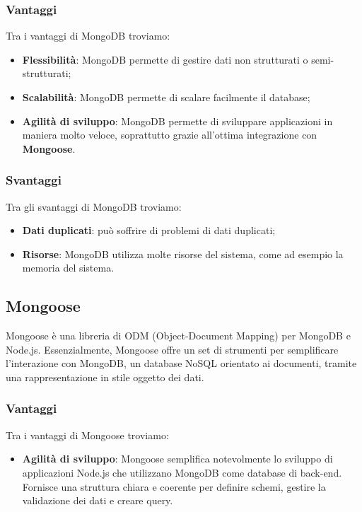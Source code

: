 \subsubsection*{Vantaggi}
Tra i vantaggi di MongoDB troviamo:
\begin{itemize}
    \item \textbf{Flessibilità}: MongoDB permette di gestire dati non strutturati o semi-strutturati;
    \item \textbf{Scalabilità}: MongoDB permette di scalare facilmente il database;
    \item \textbf{Agilità di sviluppo}: MongoDB permette di sviluppare applicazioni in maniera molto veloce, soprattutto
    grazie all'ottima integrazione con \textbf{Mongoose}.
\end{itemize}

\subsubsection*{Svantaggi}
Tra gli svantaggi di MongoDB troviamo:
\begin{itemize}
    \item \textbf{Dati duplicati}: può soffrire di problemi di dati duplicati;
    \item \textbf{Risorse}: MongoDB utilizza molte risorse del sistema, come ad esempio la memoria del sistema.
\end{itemize}


\subsection*{Mongoose}
Mongoose è una libreria di ODM (Object-Document Mapping) per
MongoDB e Node.js. Essenzialmente, Mongoose offre un set di strumenti
per semplificare l'interazione con MongoDB, un database NoSQL orientato
ai documenti, tramite una rappresentazione in stile oggetto dei dati.

\subsubsection*{Vantaggi}
Tra i vantaggi di Mongoose troviamo:
\begin{itemize}
    \item \textbf{Agilità di sviluppo}: Mongoose semplifica notevolmente lo sviluppo di applicazioni Node.js che utilizzano MongoDB come database di back-end. Fornisce una struttura chiara e coerente per definire schemi, gestire la validazione dei dati e creare query.
\end{itemize}

